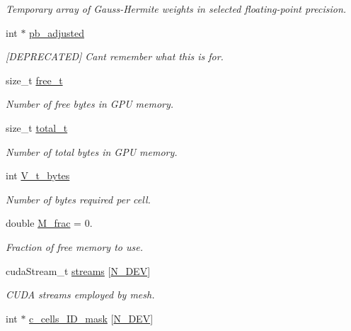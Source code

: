 \begin{DoxyCompactItemize}
\begin{DoxyCompactList}\small\item\em Temporary array of Gauss-\/\+Hermite weights in selected floating-\/point precision. \end{DoxyCompactList}\item 
int $\ast$ \hyperlink{classMesh_a18ec8295d5ad53439973008ac659348a}{pb\+\_\+adjusted}
\begin{DoxyCompactList}\small\item\em \mbox{[}D\+E\+P\+R\+E\+C\+A\+T\+ED\mbox{]} Can\textquotesingle{}t remember what this is for. \end{DoxyCompactList}\item 
size\+\_\+t \hyperlink{classMesh_ac90298b2c95c119f4c5e74245710214d}{free\+\_\+t}
\begin{DoxyCompactList}\small\item\em Number of free bytes in G\+PU memory. \end{DoxyCompactList}\item 
size\+\_\+t \hyperlink{classMesh_ac23ac4c93953c3264ce7fd184f33d556}{total\+\_\+t}
\begin{DoxyCompactList}\small\item\em Number of total bytes in G\+PU memory. \end{DoxyCompactList}\item 
int \hyperlink{classMesh_a6023095ae0a26750d9a37039a3963e43}{V\+\_\+t\+\_\+bytes}
\begin{DoxyCompactList}\small\item\em Number of bytes required per cell. \end{DoxyCompactList}\item 
double \hyperlink{classMesh_a33f7215b6094f37bd64d01f09804bf32}{M\+\_\+frac} = 0.
\begin{DoxyCompactList}\small\item\em Fraction of free memory to use. \end{DoxyCompactList}\item 
cuda\+Stream\+\_\+t \hyperlink{classMesh_a039c69a9dbffbad589dcfa8146101322}{streams} \mbox{[}\hyperlink{cppspec_8h_a2b674dab7a14f1bf32b48b7fda5022dc}{N\+\_\+\+D\+EV}\mbox{]}
\begin{DoxyCompactList}\small\item\em C\+U\+DA streams employed by mesh. \end{DoxyCompactList}\item 
int $\ast$ \hyperlink{classMesh_ae5305deb9718854c1b16bbfcf69f173a}{c\+\_\+cells\+\_\+\+I\+D\+\_\+mask} \mbox{[}\hyperlink{cppspec_8h_a2b674dab7a14f1bf32b48b7fda5022dc}{N\+\_\+\+D\+EV}\mbox{]}

\end{DoxyCompactItemize}

